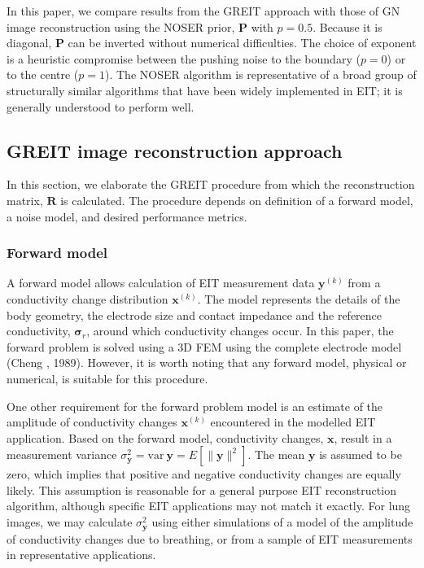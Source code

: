 \documentclass[12pt]{iopart}
\newcommand{\xB}{\mbox{$\mathbf{x}$}}
\newcommand{\yB}{\mbox{$\mathbf{y}$}}
\newcommand{\RB}{\mbox{$\mathbf{R}$}}
\renewcommand{\PB}{\mbox{$\mathbf{P}$}}
\newcommand{\sG}{\mbox{${\boldsymbol \sigma}$}}
\begin{document}
In this paper, we compare results from the GREIT approach
with those of GN image reconstruction using the NOSER prior,
$\PB$ with $p=0.5$.
Because it is diagonal, $\PB$ can be
inverted without numerical difficulties. The choice of exponent is
a heuristic compromise between the pushing noise to the boundary
($p=0$) or to the centre ($p=1$). The NOSER algorithm is 
representative of a broad group of structurally similar 
algorithms that have been widely implemented in EIT;
it is generally understood to perform well.


\subsection{GREIT image reconstruction approach}

In this section, we elaborate the GREIT procedure
from which the reconstruction matrix, $\RB$ is
calculated.  The procedure depends on definition
of a forward model, a noise model, and
desired performance metrics.

\subsubsection{Forward model}

A forward model allows calculation of EIT
 measurement
data $\yB^{(k)}$ from a conductivity change distribution $\xB^{(k)}$.
The model represents the details of the body geometry,
the electrode size and contact impedance and the reference
conductivity, $\sG_r$, around which conductivity changes occur.
In this paper, the forward problem is solved using a
3D FEM using the complete electrode model
(Cheng \etal, 1989). However, it is worth noting that 
any forward model, physical or numerical, is suitable
for this procedure.

One other requirement for the forward problem model is
an estimate of the amplitude of conductivity changes $\xB^{(k)}$
encountered in the modelled EIT application. Based on the
forward model, conductivity changes, $\xB$, result in
a measurement variance
$\sigma_{\yB}^2 = \mathrm{var}~\yB = E[ \| \yB \|^2 ]$. 
The mean $\yB$ is assumed to be zero, which implies
that positive and negative conductivity changes are
equally likely. This assumption is reasonable for a 
general purpose EIT reconstruction algorithm, although
specific EIT applications may not match it exactly.
For lung images, we may calculate $\sigma_{\yB}^2$ using
either simulations of
a model of the amplitude of conductivity changes due
to breathing, or from a sample of EIT measurements 
in representative applications.
\end{document}
